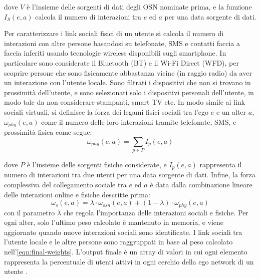 \documentclass[12pt,italian]{report}
\begin{document}
dove $V$ è l'insieme delle sorgenti di dati degli OSN nominate prima, e la funzione $I_S (e, a)$ calcola il numero di interazioni tra $e$ ed $a$ per una data sorgente di dati. 

Per caratterizzare i link sociali fisici di un utente si calcola il numero di interazioni con altre persone basandosi su telefonate, SMS e contatti faccia a faccia inferiti usando tecnologie wireless disponibili sugli smartphone. In particolare sono considerate il Bluetooth (BT) e il Wi-Fi Direct (WFD), per scoprire persone che sono fisicamente abbastanza vicine (in raggio radio) da aver un interazione con l'utente locale. Sono filtrati i dispositivi che non si trovano in prossimità dell'utente, e sono selezionati solo i dispositivi personali dell'utente, in modo tale da non considerare stampanti, smart TV etc. In modo simile ai link sociali virtuali, si definisce la forza dei legami fisici sociali tra l'ego $e$ e un alter $a$, $\omega_{phy}(e, a)$ come il numero delle loro interazioni tramite telefonate, SMS, e prossimità fisica come segue:
\begin{equation}
	\omega_{phy}(e, a) = \sum_{p \in P}I_p(e,a)
\end{equation}

\noindent dove $P$ è l'insieme delle sorgenti fisiche considerate, e $I_p(e,a)$ rappresenta il numero di interazioni tra due utenti per una data sorgente di dati. Infine, la forza complessiva del collegamento sociale tra $e$ ed $a$ è data dalla combinazione lineare delle interazioni online e fisiche descritte prima:
\begin{equation}
\label{eqn:final-weights}
	\omega_s(e,a) = \lambda \cdot \omega_{osn}(e,a) + (1 - \lambda)
	\cdot \omega_{phy}(e,a)
\end{equation}
con il parametro $\lambda$ che regola l'importanza delle interazioni sociali e fisiche. Per ogni alter, solo l'ultimo peso calcolato è mantenuto in memoria, e viene aggiornato quando nuove interazioni sociali sono identificate. I link sociali tra l'utente locale e le altre persone sono raggruppati in base al peso calcolato nell'\autoref{eqn:final-weights}. L'output finale è un array di valori in cui ogni elemento rappresenta la percentuale di utenti attivi in ogni cerchio della ego network di un utente \cite{ego-net}. 
\end{document}

